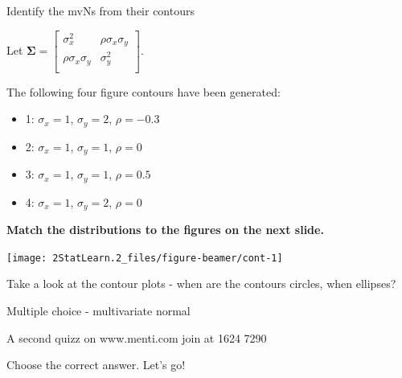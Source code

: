 \documentclass[
  ignorenonframetext,
]{beamer}
\providecommand{\tightlist}{%
  \setlength{\itemsep}{0pt}\setlength{\parskip}{0pt}}
\begin{document}
\begin{frame}
\begin{block}{Identify the mvNs from their contours}
\protect\hypertarget{identify-the-mvns-from-their-contours}{}
\vspace{4mm}

Let
\(\boldsymbol\Sigma=\left[\begin{array}{cc} \sigma_x^2 & \rho\sigma_{x}\sigma_{y}\\\rho\sigma_{x}\sigma_{y}&\sigma_y^2\\ \end{array} \right]\).

\vspace{4mm}

The following four figure contours have been generated:

\begin{itemize}
\tightlist
\item
  1: \(\sigma_x=1\), \(\sigma_y=2\), \(\rho=-0.3\)
\item
  2: \(\sigma_x=1\), \(\sigma_y=1\), \(\rho=0\)
\item
  3: \(\sigma_x=1\), \(\sigma_y=1\), \(\rho=0.5\)
\item
  4: \(\sigma_x=1\), \(\sigma_y=2\), \(\rho=0\)
\end{itemize}

\vspace{8mm}

\textbf{Match the distributions to the figures on the next slide.}
\end{block}
\end{frame}

\begin{frame}
\begin{center}\texttt{[image: 2StatLearn.2\_files/figure-beamer/cont-1]} \end{center}

Take a look at the contour plots - when are the contours circles, when
ellipses?
\end{frame}

\begin{frame}
\begin{block}{Multiple choice - multivariate normal}
\protect\hypertarget{multiple-choice---multivariate-normal}{}
\vspace{2mm}

A second quizz on www.menti.com join at 1624 7290

Choose the correct answer. Let's go!
\end{block}
\end{frame}
\end{document}
